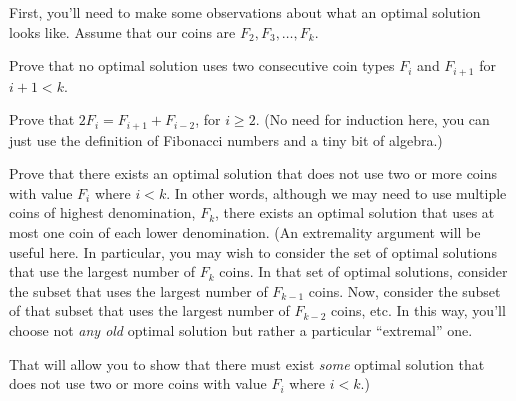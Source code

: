 \documentclass{ks-pset}
\begin{document}
\begin{problem}
  \begin{subproblems}

    \item First, you'll need to make some observations about what an optimal
      solution looks like.  Assume that our coins are $F_2, F_3, \dots, F_k$.

      \begin{subproblems}
        \item Prove that no optimal solution uses two consecutive coin types
          $F_{i}$ and $F_{i+1}$ for $i+1 < k$.

        \item Prove that $2F_{i} = F_{i+1} + F_{i-2}$, for $i ≥ 2$.  (No need
          for induction here, you can just use the definition of Fibonacci
          numbers and a tiny bit of algebra.)

        \item \label{part:safe} Prove that there exists an optimal solution
          that does not use two or more coins with value $F_i$ where $i < k$.
          In other words, although we may need to use multiple coins of highest
          denomination, $F_k$, there exists an optimal solution that uses at
          most one coin of each lower denomination.  (An extremality argument
          will be useful here.  In particular, you may wish to consider the set
          of optimal solutions that use the largest number of $F_k$ coins.  In
          that set of optimal solutions, consider the subset that uses the
          largest number of $F_{k-1}$ coins.  Now, consider the subset of that
          subset that uses the largest number of $F_{k-2}$ coins, etc.  In this
          way, you'll choose not \emph{any old} optimal solution but rather a
          particular ``extremal'' one.

          That will allow you to show that there must exist \emph{some} optimal
          solution that does not use two or more coins with value $F_i$ where $i <
          k$.)
      \end{subproblems}


\end{subproblems}
\end{problem}
\end{document}

